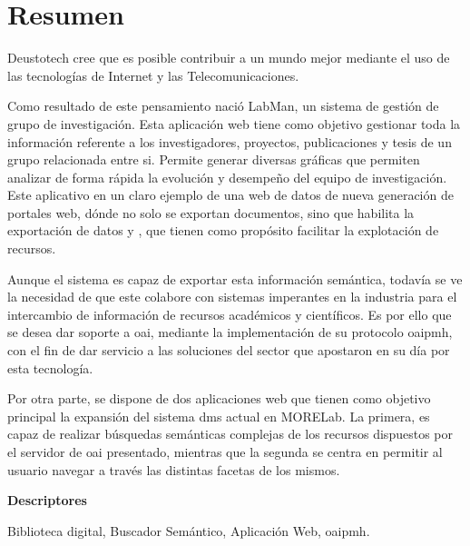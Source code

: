 \chapter*{Resumen}

Deustotech cree que es posible contribuir a un mundo mejor mediante el uso de
las tecnologías de Internet y las Telecomunicaciones.

Como resultado de este pensamiento nació LabMan, un sistema de gestión de grupo
de investigación. Esta aplicación web tiene como objetivo gestionar toda la
información referente a los investigadores, proyectos, publicaciones y tesis de un grupo relacionada entre si. Permite generar diversas gráficas que permiten analizar de forma rápida la evolución y desempeño del equipo de investigación.
Este aplicativo en un claro ejemplo de una web de datos de nueva generación de
portales web, dónde no solo se exportan documentos, sino que habilita la
exportación de datos y , que tienen como propósito facilitar la explotación
de recursos.

Aunque el sistema es capaz de exportar esta información semántica, todavía se ve la necesidad de que este colabore con  sistemas imperantes en la industria para el intercambio de información de recursos académicos y científicos.
Es por ello que se desea dar soporte a \acrshort{oai}, mediante la implementación de su
protocolo \acrshort{oaipmh}, con el fin de dar servicio a las soluciones del sector que
apostaron en su día por esta tecnología.

Por otra parte, se dispone de dos aplicaciones web que tienen como objetivo
principal la expansión del sistema \acrshort{dms} actual en MORELab. La primera, es capaz
de realizar búsquedas semánticas complejas de los recursos dispuestos por el
servidor de \acrshort{oai} presentado, mientras que la segunda se centra en permitir al
usuario navegar a través las distintas facetas de los mismos.

\vspace{2em}

{\Large\bfseries\sffamily Descriptores}
\vspace{3\medskipamount}

Biblioteca digital, Buscador Semántico, Aplicación Web, \acrshort{oaipmh}.
